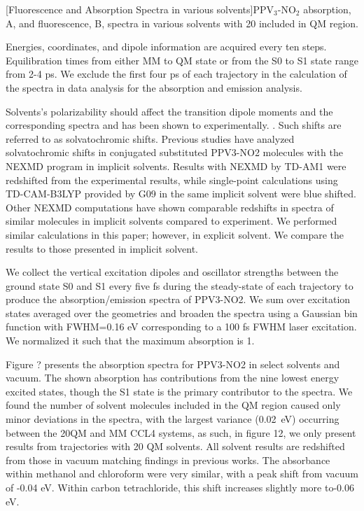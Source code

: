 \noindent
\begin{multiFigure} 
  [Fluorescence and Absorption Spectra in various solvents]{PPV\(_3\)-NO\(_2\) absorption, A, and fluorescence, B, spectra in various solvents with 20 included in QM region.}
  \label{fig:spectranquant}
\end{multiFigure}\bigskip


    Energies, coordinates, and dipole information are acquired every ten steps.
    Equilibration times from either MM to QM state or from the S0 to S1 state range from 2-4 ps.
    We exclude the first four ps of each trajectory in the calculation of the spectra in data analysis for the absorption and emission analysis. 


Solvents's polarizability should affect the transition dipole moments and the corresponding spectra and has been shown to experimentally. \cite{marcus1956electrostatic,martin1998hydrolysis,park2013tailored,LeDroumaguet2005}.
Such shifts are referred to as solvatochromic shifts.
    Previous studies have analyzed solvatochromic shifts in conjugated substituted PPV3-NO2 molecules with the NEXMD program in implicit solvents.\cite{Santhanamoorthi2009}
    Results with NEXMD by TD-AM1 were redshifted from the experimental results, while single-point calculations using TD-CAM-B3LYP provided by G09 in the same implicit solvent were blue shifted.
    Other NEXMD computations have shown comparable redshifts in spectra of similar molecules in implicit solvents compared to experiment. \cite{Bjorgaard2015}
    We performed similar calculations in this paper; however, in explicit solvent.
    We compare the results to those presented in implicit solvent.

    We collect the vertical excitation dipoles and oscillator strengths between the ground state S0 and S1 every five fs during the steady-state of each trajectory to produce the absorption/emission spectra of PPV3-NO2.
    We sum over excitation states averaged over the geometries and broaden the spectra using a Gaussian bin function with FWHM=0.16 eV corresponding to a 100 fs FWHM laser excitation.
    We normalized it such that the maximum absorption is 1. 

    Figure ? presents the absorption spectra for PPV3-NO2 in select solvents and vacuum.
    The shown absorption has contributions from the nine lowest energy excited states, though the S1 state is the primary contributor to the spectra.
    We found the number of solvent molecules included in the QM region caused only minor deviations in the spectra, with the largest variance (0.02~eV) occurring between the 20QM and MM CCL4 systems, as such, in figure 12, we only present results from trajectories with 20 QM solvents.
    All solvent results are redshifted from those in vacuum matching findings in previous works.
    The absorbance within methanol and chloroform were very similar, with a peak shift from vacuum of -0.04 eV.
    Within carbon tetrachloride, this shift increases slightly more to-0.06 eV. 

